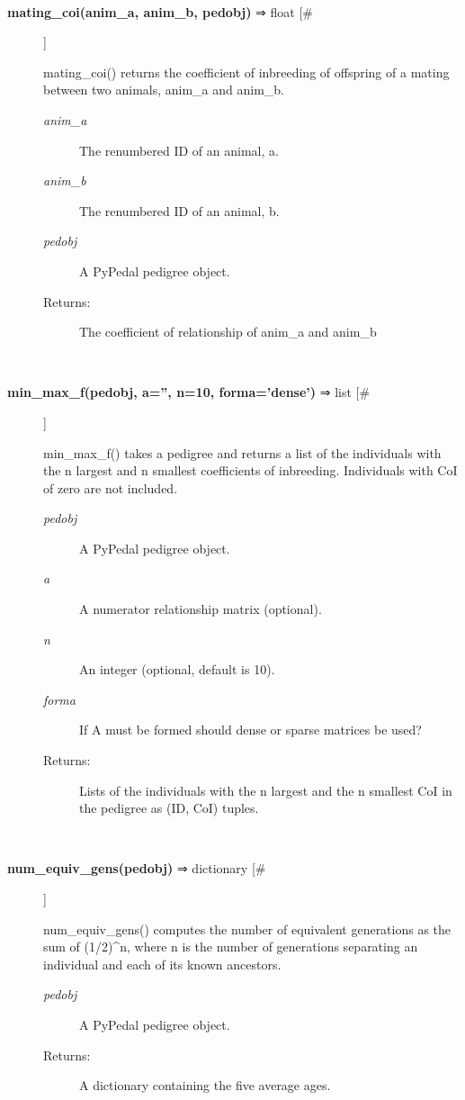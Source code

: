 \begin{description}
\begin{description}
\end{description}
\\ 

\item[\textbf{mating\_coi(anim\_a, anim\_b, pedobj)}
 ⇒ float [\#]]

 mating\_coi() returns the coefficient of inbreeding of offspring of a mating between two animals, anim\_a and anim\_b.
\begin{description}
\item[\emph{anim\_a}
] The renumbered ID of an animal, a.
\item[\emph{anim\_b}
] The renumbered ID of an animal, b.
\item[\emph{pedobj}
] A PyPedal pedigree object.
\item[Returns:] The coefficient of relationship of anim\_a and anim\_b

\end{description}
\\ 

\item[\textbf{min\_max\_f(pedobj, a='', n=10, forma='dense')}
 ⇒ list [\#]]

 min\_max\_f() takes a pedigree and returns a list of the individuals with the n largest and n smallest coefficients of inbreeding. Individuals with CoI of zero are not included.
\begin{description}
\item[\emph{pedobj}
] A PyPedal pedigree object.
\item[\emph{a}
] A numerator relationship matrix (optional).
\item[\emph{n}
] An integer (optional, default is 10).
\item[\emph{forma}
] If A must be formed should dense or sparse matrices be used?
\item[Returns:] Lists of the individuals with the n largest and the n smallest CoI in the pedigree as (ID, CoI) tuples.

\end{description}
\\ 

\item[\textbf{num\_equiv\_gens(pedobj)}
 ⇒ dictionary [\#]]

 num\_equiv\_gens() computes the number of equivalent generations as the sum of (1/2)\^{}n, where n is the number of generations separating an individual and each of its known ancestors.
\begin{description}
\item[\emph{pedobj}
] A PyPedal pedigree object.
\item[Returns:] A dictionary containing the five average ages.


\end{description}
\end{description}
